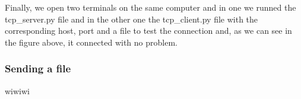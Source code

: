 Finally, we open two terminals on the same computer and in one we runned the tcp\_server.py file and in the other one the tcp\_client.py file with the corresponding host, port and a file to test the connection and, as we can see in the figure above, it connected with no problem.

\subsubsection{Sending a file}
wiwiwi

